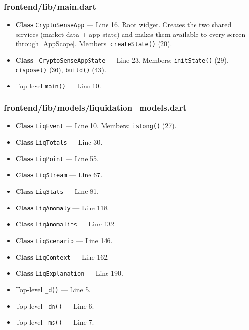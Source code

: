 \subsubsection*{frontend/lib/main.dart}
\begin{itemize}[nosep,leftmargin=1.5em]
\item \textbf{Class} \texttt{CryptoSenseApp} --- Line 16. Root widget. Creates the two shared services (market data + app state) and makes them available to every screen through [AppScope]. Members: \texttt{createState(\allowbreak{})} (20).
\item \textbf{Class} \texttt{\_\allowbreak{}CryptoSenseAppState} --- Line 23. Members: \texttt{initState(\allowbreak{})} (29), \texttt{dispose(\allowbreak{})} (36), \texttt{build(\allowbreak{})} (43).
\item Top-level \texttt{main(\allowbreak{})} --- Line 10.
\end{itemize}
\subsubsection*{frontend/lib/models/liquidation\_models.dart}
\begin{itemize}[nosep,leftmargin=1.5em]
\item \textbf{Class} \texttt{LiqEvent} --- Line 10. Members: \texttt{isLong(\allowbreak{})} (27).
\item \textbf{Class} \texttt{LiqTotals} --- Line 30.
\item \textbf{Class} \texttt{LiqPoint} --- Line 55.
\item \textbf{Class} \texttt{LiqStream} --- Line 67.
\item \textbf{Class} \texttt{LiqStats} --- Line 81.
\item \textbf{Class} \texttt{LiqAnomaly} --- Line 118.
\item \textbf{Class} \texttt{LiqAnomalies} --- Line 132.
\item \textbf{Class} \texttt{LiqScenario} --- Line 146.
\item \textbf{Class} \texttt{LiqContext} --- Line 162.
\item \textbf{Class} \texttt{LiqExplanation} --- Line 190.
\item Top-level \texttt{\_\allowbreak{}d(\allowbreak{})} --- Line 5.
\item Top-level \texttt{\_\allowbreak{}dn(\allowbreak{})} --- Line 6.
\item Top-level \texttt{\_\allowbreak{}ms(\allowbreak{})} --- Line 7.
\end{itemize}
